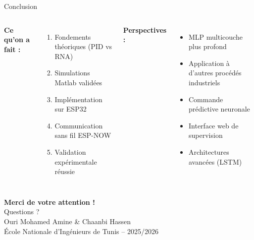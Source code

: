 \documentclass[aspectratio=169,12pt]{beamer}
\begin{document}
\begin{frame}{Conclusion}
\begin{columns}[c]
\textbf{Ce qu'on a fait :}
\begin{enumerate}\small
  \item Fondements théoriques (PID vs RNA)
  \item Simulations Matlab validées
  \item Implémentation sur ESP32
  \item Communication sans fil ESP-NOW
  \item Validation expérimentale réussie
\end{enumerate}

\textbf{Perspectives :}
\begin{itemize}\small
  \item MLP multicouche plus profond
  \item Application à d'autres procédés industriels
  \item Commande prédictive neuronale
  \item Interface web de supervision
  \item Architectures avancées (LSTM)
\end{itemize}
\end{columns}
\end{frame}

{
\begin{frame}[plain]

\vspace{2cm}
\begin{center}
  {\color{white}\Huge\textbf{Merci de votre attention !}}\\[24pt]
  {\color{white}\Large Questions ?}\\[30pt]
  {\color{white}\normalsize Ouri Mohamed Amine \& Chaanbi Hassen}\\[6pt]
  {\color{white}\small École Nationale d'Ingénieurs de Tunis -- 2025/2026}
\end{center}
\end{frame}
}
\end{document}
